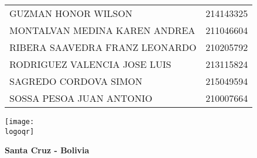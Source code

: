 \documentclass[a4paper]{article} %
\newcommand{\logoqr}{img/qr.png}
\begin{document}
\begin{titlepage}
\begin{minipage}{0.79\textwidth}
\begin{flushleft}
\begin{longtable}[c]{|l|c|}
                    
                    \hline
                                            {GUZMAN HONOR WILSON} &             {214143325} \\
                    \rowcolor{lightblue}    {MONTALVAN MEDINA KAREN ANDREA} &   {211046604} \\
                                            {RIBERA SAAVEDRA FRANZ LEONARDO} &  {210205792} \\
                    \rowcolor{lightblue}    {RODRIGUEZ VALENCIA JOSE LUIS} &    {213115824} \\
                                            {SAGREDO CORDOVA SIMON} &           {215049594} \\
                    \rowcolor{lightblue}    {SOSSA PESOA JUAN ANTONIO} &        {210007664} \\
                    
                    \hline

                    \end{longtable}
            \end{flushleft}
        \end{minipage}
        \hfill  %
        \begin{minipage}{0.20\textwidth}  %
            \begin{flushright}
                \texttt{[image: \\logoqr]}  %
            \end{flushright}
        \end{minipage}


        \vspace{1cm}  %
        \Large\textbf{Santa Cruz - Bolivia}\par

    \end{titlepage}

    \clearpage  %
    \begin{doublespace}     %
    \tableofcontents %
    \end{doublespace}
    \clearpage  %
\end{document}
